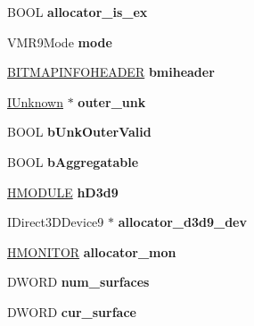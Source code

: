 \begin{DoxyCompactItemize}
\item 
\mbox{\label{structquartz__vmr_a7b119871e1e5d33dd5275746de4a6fd5}} 
B\+O\+OL {\bfseries allocator\+\_\+is\+\_\+ex}
\item 
\mbox{\label{structquartz__vmr_a6885702a5ae901ee27212808eded6e98}} 
V\+M\+R9\+Mode {\bfseries mode}
\item 
\mbox{\label{structquartz__vmr_a28be252be09464d545496810646af49c}} 
\hyperlink{struct_b_i_t_m_a_p_i_n_f_o_h_e_a_d_e_r}{B\+I\+T\+M\+A\+P\+I\+N\+F\+O\+H\+E\+A\+D\+ER} {\bfseries bmiheader}
\item 
\mbox{\label{structquartz__vmr_adc342aa7177de5b65fb545e59172a188}} 
\hyperlink{interface_i_unknown}{I\+Unknown} $\ast$ {\bfseries outer\+\_\+unk}
\item 
\mbox{\label{structquartz__vmr_ae0b2e8c813293ba61fd339e612dfa270}} 
B\+O\+OL {\bfseries b\+Unk\+Outer\+Valid}
\item 
\mbox{\label{structquartz__vmr_a3b745568b57cff910944942658dae9ee}} 
B\+O\+OL {\bfseries b\+Aggregatable}
\item 
\mbox{\label{structquartz__vmr_abe07a5d09ebbe6e93b6f8fc3c1f27feb}} 
\hyperlink{interfacevoid}{H\+M\+O\+D\+U\+LE} {\bfseries h\+D3d9}
\item 
\mbox{\label{structquartz__vmr_a2fb574cabad99539dcf4bb4632647d6c}} 
I\+Direct3\+D\+Device9 $\ast$ {\bfseries allocator\+\_\+d3d9\+\_\+dev}
\item 
\mbox{\label{structquartz__vmr_a9364a7c32a46c424be117e8bc45190fb}} 
\hyperlink{interfacevoid}{H\+M\+O\+N\+I\+T\+OR} {\bfseries allocator\+\_\+mon}
\item 
\mbox{\label{structquartz__vmr_adfe016ab09105bbc6f29d5a8a1a05730}} 
D\+W\+O\+RD {\bfseries num\+\_\+surfaces}
\item 
\mbox{\label{structquartz__vmr_a49f62854323d018e46c8b2d822b0962b}} 
D\+W\+O\+RD {\bfseries cur\+\_\+surface}

\end{DoxyCompactItemize}
